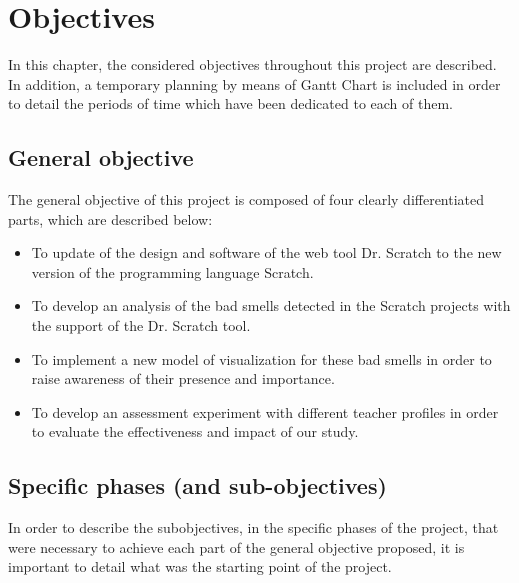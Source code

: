 

\chapter{Objectives} 
\label{chap:objectives} 

In this chapter, the considered objectives throughout this project are described. In addition, a temporary planning by means of Gantt Chart is included in order to detail the periods of time which have been dedicated to each of them.

\section{General objective}
\label{sec:general-objective}

The general objective of this project is composed of four clearly differentiated parts, which are described below:

\begin{itemize}
    \item To update of the design and software of the web tool Dr. Scratch to the new version of the programming language Scratch. 
    \item To develop an analysis of the bad smells detected in the Scratch projects with the support of the Dr. Scratch tool. 
    \item To implement a new model of visualization for these bad smells in order to raise awareness of their presence and importance. 
    \item To develop an assessment experiment with different teacher profiles in order to evaluate the effectiveness and impact of our study.
\end{itemize}


\section{Specific phases (and sub-objectives)}
\label{sec:specific-objectives}

In order to describe the subobjectives, in the specific phases of the project, that were necessary to achieve each part of the general objective proposed, it is important to detail what was the starting point of the project. 


